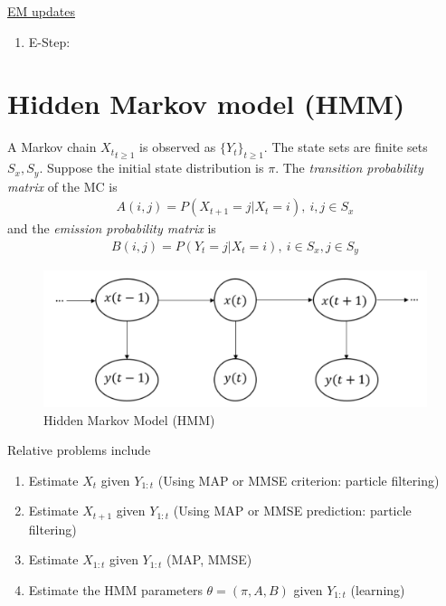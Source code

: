 \documentclass[11pt]{elegantbook}
\begin{document}
\underline{EM updates}
\begin{enumerate}
    \item E-Step:
\end{enumerate}













\chapter{Hidden Markov model (HMM)}
A Markov chain ${X_t}_{t\geq 1}$ is observed as $\{Y_t\}_{t\geq 1}$. The state sets are finite sets $S_x, S_y$. Suppose the initial state distribution is $\pi$. The \textit{transition probability matrix} of the MC is
\begin{equation}
    \begin{aligned}
        A(i,j)=P(X_{t+1}=j|X_{t}=i),\ i,j\in S_x
    \end{aligned}
    \nonumber
\end{equation}
and the \textit{emission probability matrix} is
\begin{equation}
    \begin{aligned}
        B(i,j)=P(Y_t=j|X_t=i),\ i\in S_x, j\in S_y
    \end{aligned}
    \nonumber
\end{equation}
\begin{center}\begin{figure}[htbp]
    \centering
    \includegraphics[scale=0.15]{HDM.png}
    \caption{Hidden Markov Model (HMM)}
    \label{}
\end{figure}\end{center}

Relative problems include
\begin{enumerate}
    \item Estimate $X_t$ given $Y_{1:t}$ (Using MAP or MMSE criterion: particle filtering)
    \item Estimate $X_{t+1}$ given $Y_{1:t}$ (Using MAP or MMSE prediction: particle filtering)
    \item Estimate $X_{1:t}$ given $Y_{1:t}$ (MAP, MMSE)
    \item Estimate the HMM parameters $\theta=(\pi,A,B)$ given $Y_{1:t}$ (learning)
\end{enumerate}
\end{document}
